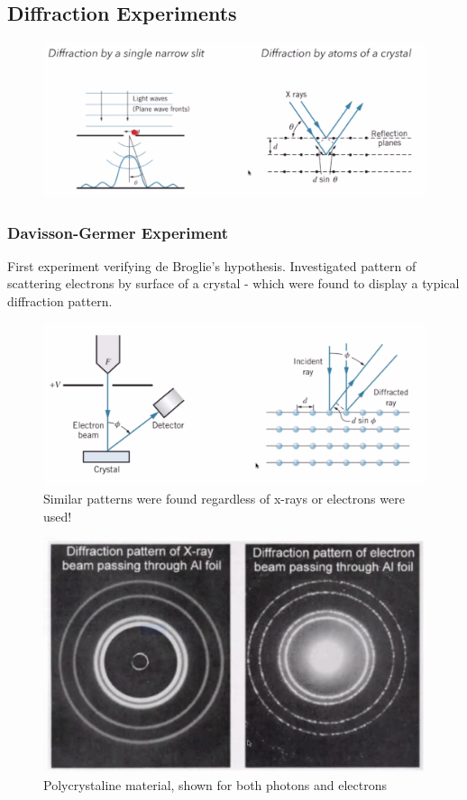 \documentclass[class=article,crop=false]{standalone}
\begin{document}
\newpage
\subsection{Diffraction Experiments}

\begin{figure}[h!]
	\centering
	\includegraphics[width=.8\linewidth]{./Images/diffraction.png}
	\caption{}
\end{figure}

\subsubsection{Davisson-Germer Experiment}
First experiment verifying de Broglie's hypothesis. Investigated pattern of scattering electrons by surface of a crystal - which were found to display a typical diffraction pattern. 

\begin{figure}[h!]
	\centering
	\includegraphics[width=.8\linewidth]{./Images/davisson.png}
	\caption{Similar patterns were found regardless of x-rays or electrons were used!}
\end{figure}


\begin{figure}[h!]
	\centering
	\includegraphics[width=.8\linewidth]{./Images/patterns.png}
	\caption{Polycrystaline material, shown for both photons and electrons}
\end{figure}
\end{document}
